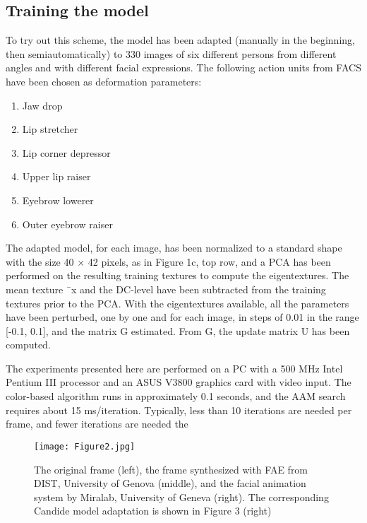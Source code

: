 \documentclass[12pt]{spieman}  %
\begin{document}
\begin{spacing}{2}
\subsection{Training the model}

To try out this scheme, the model has been adapted (manually in the beginning, then semiautomatically) to 330 images of six different persons from different angles and with different facial expressions. The following action units from FACS have been chosen as deformation parameters:


\begin{enumerate}
    \item Jaw drop
    \item Lip stretcher
    \item Lip corner depressor
    \item Upper lip raiser
    \item Eyebrow lowerer
    \item Outer eyebrow raiser
\end{enumerate}
The adapted model, for each image, has been normalized to a standard shape with the size 40 × 42 pixels, as in Figure 1c, top row, and a PCA has been performed on the resulting training textures to compute the eigentextures. The mean texture ¯x and the DC-level have been subtracted from the training textures prior to the PCA. With the eigentextures available, all the parameters have been perturbed, one by one and for each image, in steps of 0.01 in the range [-0.1, 0.1], and the matrix G estimated. From G, the update matrix U has been computed.

The experiments presented here are performed on a PC with a 500 MHz Intel Pentium III processor and an ASUS V3800 graphics card with video input. The color-based algorithm runs in approximately 0.1 seconds, and the AAM search requires about 15 ms/iteration. Typically, less than 10 iterations are needed per frame, and fewer iterations are needed the


\begin{figure}[H]
    \centering
    \texttt{[image: Figure2.jpg]}
    \caption{The original frame (left), the frame synthesized with FAE from DIST, University of Genova (middle), and the facial animation system by Miralab, University of Geneva (right). The corresponding Candide model adaptation is shown in Figure 3 (right)}
    \label{fig2}
\end{figure}


\end{spacing}
\end{document}
